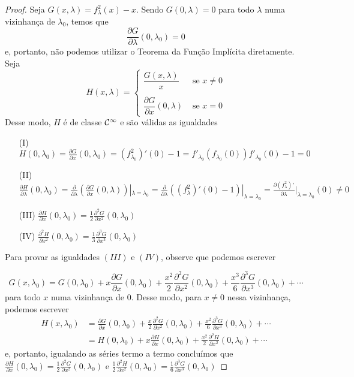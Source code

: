 \begin{proof}
Seja $G(x, \lambda) = f^2_\lambda (x) - x$. Sendo $G(0, \lambda) = 0$ para todo $\lambda$ numa vizinhança de $\lambda_0$, temos que
$$\frac{\partial G}{\partial \lambda}(0, \lambda_0) = 0$$
e, portanto, não podemos utilizar o Teorema da Função Implícita diretamente.
Seja
\[ H(x, \lambda) =
    \begin{cases} 
      \dfrac{G(x, \lambda)}{x} & \textrm{ se } x \neq 0 \\
      \\
      \dfrac{\partial G}{\partial x}(0, \lambda) & \textrm{ se } x = 0
   \end{cases}
\]
Desse modo, $H$ é de classe $\mathcal{C}^\infty$ e são válidas as igualdades
\begin{enumerate}
\item[(I)]
$H(0, \lambda_0) = \frac{\partial G}{\partial x}(0, \lambda_0) = (f^2_{\lambda_0})'(0) - 1 = f'_{\lambda_0}(f_{\lambda_0}(0)) f'_{\lambda_0}(0) - 1 = 0 $

\item[(II)]
$\frac{\partial H}{\partial \lambda}(0, \lambda_0) = \frac{\partial}{\partial \lambda} \left( \frac{\partial G}{\partial x}(0, \lambda) \right) |_{\lambda = \lambda_0} = \frac{\partial}{\partial \lambda}((f^2_\lambda)'(0) - 1)|_{\lambda = \lambda_0} = \frac{\partial (f^2_\lambda)'}{\partial \lambda}|_{\lambda = \lambda_0}(0) \neq 0$
 
\item[(III)]
$ \frac{\partial H}{\partial x}(0, \lambda_0) = \frac{1}{2}\frac{\partial^2 G}{\partial x^2}(0, \lambda_0) $
\item[(IV)]
$\frac{\partial^2 H}{\partial x^2}(0, \lambda_0) = \frac{1}{3} \frac{\partial^3 
G}{\partial x^3}(0, \lambda_0)$
\end{enumerate}

Para provar as igualdades $(III)$ e $(IV)$, observe que podemos escrever

$$G(x,  \lambda_0) = G(0, \lambda_0) + x \frac{\partial G}{\partial x}(0, \lambda_0) + \frac{x^2}{2} \frac{\partial ^2 G}{\partial x^2} (0, \lambda_0) + \frac{x^3}{6} \frac{\partial ^3 G}{\partial x^3} (0, \lambda_0) + \cdots$$
para todo $x$ numa vizinhança de $0$. Desse modo, para $x \neq 0$ nessa vizinhança, podemos escrever
\begin{align*}
H(x, \lambda_0) & = \frac{\partial G}{\partial x}(0, \lambda_0) + \frac{x}{2} \frac{\partial ^2 G}{\partial x^2} (0, \lambda_0) + \frac{x^2}{6} \frac{\partial ^3 G}{\partial x^3} (0, \lambda_0) + \cdots \\
& = H(0, \lambda_0) + x \frac{\partial H}{\partial x}(0, \lambda_0) + \frac{x^2}{2} \frac{\partial ^2 H}{\partial x^2} (0, \lambda_0) + \cdots
\end{align*}
e, portanto, igualando as séries termo a termo concluímos que $\frac{\partial H}{\partial x}(0, \lambda_0) = \frac{1}{2} \frac{\partial ^2 G}{\partial x^2} (0, \lambda_0)$ e $\frac{1}{2} \frac{\partial ^2 H}{\partial x^2} (0, \lambda_0) = \frac{1}{6} \frac{\partial ^3 G}{\partial x^3} (0, \lambda_0)$


\end{proof}

